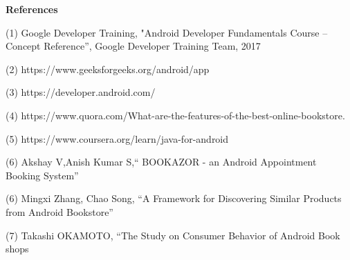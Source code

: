 \newpage
\begin{center}
\thispagestyle{empty}
\vspace*{2\baselineskip}
\LARGE{\textbf{References}}\\[1cm]
\end{center}
\thispagestyle{empty}
\doublespacing
(1) Google Developer Training, "Android Developer Fundamentals Course – Concept 
    Reference”, Google Developer Training Team, 2017 \
 
(2) https://www.geeksforgeeks.org/android/app
 
(3) https://developer.android.com/ 
 
(4) https://www.quora.com/What-are-the-features-of-the-best-online-bookstore. 
 
(5) https://www.coursera.org/learn/java-for-android
 
(6) Akshay V,Anish Kumar S,“ BOOKAZOR - an Android Appointment Booking System”

(6) Mingxi Zhang, Chao Song, “A Framework for Discovering Similar Products from 
    Android Bookstore” 

(7) Takashi OKAMOTO, “The Study on Consumer Behavior of Android Book shops
